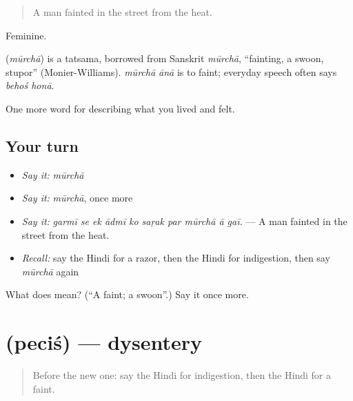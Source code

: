 \begin{quote}
A man fainted in the street from the heat.
\end{quote}

Feminine.

\begin{cousinweb}
\textbf{} (\emph{mūrchā}) is a tatsama, borrowed from Sanskrit \emph{mūrchā}, \textquotedblleft{}fainting, a swoon, stupor\textquotedblright{} (Monier-Williams). \emph{mūrchā ānā} is to faint; everyday speech often says \emph{behoś honā}.
\end{cousinweb}

\begin{grammarlens}[title={What you've built}]
One more word for describing what you lived and felt.
\end{grammarlens}

\subsection*{Your turn}
\begin{itemize}
\raggedright
  \item \emph{Say it:} \emph{mūrchā}
  \item \emph{Say it:} \emph{mūrchā}, once more
  \item \emph{Say it:} \emph{garmī se ek ādmī ko saṛak par mūrchā ā gaī.} — A man fainted in the street from the heat.
  \item \emph{Recall:} say the Hindi for a razor, then the Hindi for indigestion, then say \emph{mūrchā} again
\end{itemize}

\begin{tcolorbox}[breakable,colback=teal!4,colframe=teal!35!black,title={Before you move on}]
What does  mean? (\textquotedblleft{}A faint; a swoon\textquotedblright{}.) Say it once more.
\end{tcolorbox}
\section[\texorpdfstring{\hi{पेचिश} (peciś)}{पेचिश (peciś)}]{ (peciś) — dysentery}

\label{lesson:HI-C485-pecis}



\begin{quote}
Before the new one: say the Hindi for indigestion, then the Hindi for a faint.
\end{quote}

